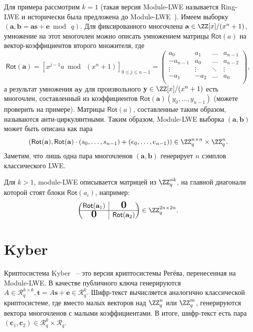 \documentclass[11pt]{exam}
\theoremstyle{definition}
\newcommand{\bigzero}{\mbox{\normalfont\Large\bfseries 0}}
\newcommand{\rvline}{\hspace*{-\arraycolsep}\vline\hspace*{-\arraycolsep}}
\let\vec\mathbf
\begin{document}
{	Для примера рассмотрим $k=1$ (такая версия Module-LWE называется Ring-LWE и исторически была предложена до Module-LWE~\cite{LPR10,SS09}). Имеем выборку $(\vec a, \vec b = \vec a \vec s + \vec e \bmod~q)$. Для фиксированного многочлена $\vec a \in \ZZ[x]/(x^n+1)$, умножение на этот многочлен можно описать умножением матрицы $\mathsf{Rot}(a)$ на вектор-коэффициентов второго множителя, где
	\[
		\mathsf{Rot}(\vec a) = [x^{j-1} a \bmod~(x^n+1)]_{0 \leq j \leq n-1}  = 
		\begin{pmatrix}
			a_0 & a_1 & \ldots & a_{n-1} \\
			-a_{n-1} & a_0 & \ldots & a_{n-2} \\
			\vdots & \vdots & \ddots & \vdots \\
			-a_1 & -a_2 & \ldots & a_0 \\
		\end{pmatrix}, 
	\]
	а результат умножения $\vec a \vec y$ для произвольного $\vec y \in \ZZ[x]/(x^n+1)$ есть многочлен, составленный из коэффициентов $\mathsf{Rot}(\vec a) (y_0, \ldots, y_{n-1})$ (можете проверить на примере). Матрицы $\mathsf{Rot}(a)$, составленные таким образом, называются анти-циркулянтными.  Таким образом, Module-LWE выборка $(\vec a, \vec b)$ может быть описана как пара
		\[
			(	\mathsf{Rot}(\vec a) , \mathsf{Rot}(\vec a) \cdot (s_0, \ldots, s_{n-1}) +  (e_0, \ldots, e_{n-1}) ) \in \ZZ_q^{n \times n} \times \ZZ_q^n.
		\]
	  Заметим, что лишь одна пара многочленов $(\vec a, \vec b)$ генерирует $n$ сэмплов классического LWE. 
	  
	  Для $k>1$, module-LWE описывается матрицей из $\ZZ_q^{nk}$, на главной диагонали которой стоят блоки $\mathsf{Rot}(a_i)$, например:
	\[
	\begin{pmatrix}
		\begin{matrix}
			\mathsf{Rot}(\vec a_1)
		\end{matrix}
		& \rvline & \bigzero \\
		\hline
		\bigzero & \rvline &
		\begin{matrix}
			\mathsf{Rot}(\vec a_2)
		\end{matrix}
	\end{pmatrix} \in \ZZ_q^{2n \times 2n}.
	\]
	
	\section{Kyber}
	
	Криптосистема Kyber~\cite{Kyber} -- это версия криптосистемы Регёва, перенесенная на Module-LWE. В качестве публичного ключа генерируются $A \in \mathcal{R}_q^{k \times k}, \vec t = A \vec s + \vec e \in  \mathcal{R}_q^k$. Шифр-текст вычисляется аналогично классической криптосистеме, где вместо малых векторов над $\ZZ_q^n$ или $\ZZ_q^m$, генерируются вектора многочленов с малыми коэффициентами. В итоге, шифр-текст есть пара $(\vec c_1, \vec c_2) \in \mathcal{R}_q^k \times  \mathcal{R}_q$.
	
}
\end{document}
